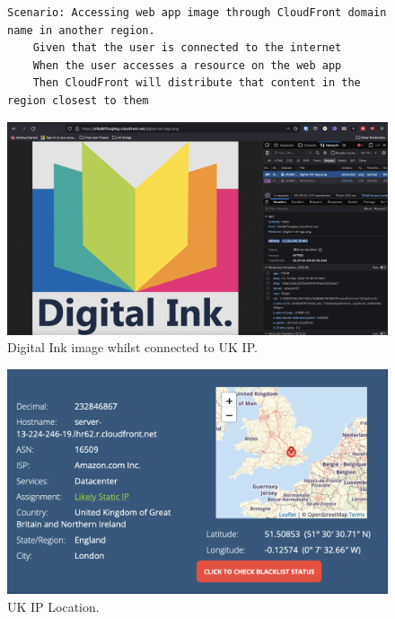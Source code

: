 \clearpage

\begin{figure}[!htbp]
    \centering
    \begin{verbatim}
Scenario: Accessing web app image through CloudFront domain name in another region.
    Given that the user is connected to the internet
    When the user accesses a resource on the web app
    Then CloudFront will distribute that content in the region closest to them
    \end{verbatim}
    \label{fig:accessing-image-cloudfront-diff-region}
\end{figure}

\begin{figure}[!htbp]
    \centering
    \includegraphics[width=\textwidth]{resources/cloudfront/cloudfront-test-uk}
    \caption{Digital Ink image whilst connected to UK IP.}
    \label{fig:cloudfront-test--uk}
\end{figure}

\begin{figure}[!htbp]
    \centering
    \includegraphics[width=\textwidth]{resources/cloudfront/cloudfront-test-uk-ip}
    \caption{UK IP Location.}
    \label{fig:cloudfront-test-uk-ip}
\end{figure}

